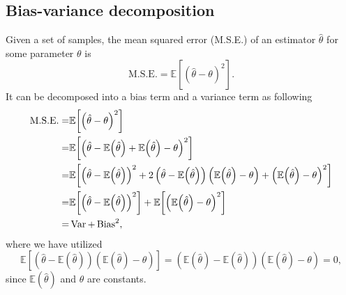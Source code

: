 \begin{appendices}
\chapter{Bias-variance decomposition\label{chapter:Appendix:BVD}}
Given a set of samples, the mean squared error (M.S.E.) of an estimator $\hat{\theta}$ for some parameter $\theta$ is
\begin{equation}
	\text{M.S.E.} = \mathbb{E}{\left[\left(\hat{\theta}-\theta\right)^2\right]}.
\end{equation}
It can be decomposed into a bias term and a variance term as following
\begin{align}
	\text{M.S.E.} =& \mathbb{E}{\left[\left(\hat{\theta}-\theta\right)^2\right]}\notag\\
	       =& \mathbb{E}{\left[\left(\hat{\theta}-\mathbb{E}{\left(\hat{\theta}\right)}+\mathbb{E}{\left(\hat{\theta}\right)}-\theta\right)^2\right]}\notag\\
	       =& \mathbb{E}{\left[ \left(\hat{\theta}-\mathbb{E}{\left(\hat{\theta}\right)}\right)^2+ 2\left(\hat{\theta}-\mathbb{E}{\left(\hat{\theta}\right)}\right)\left(\mathbb{E}{\left(\hat{\theta}\right)}-\theta\right)  +\left(\mathbb{E}{\left(\hat{\theta}\right)}-\theta\right)^2\right]}\notag\\
	       =&\mathbb{E}{\left[ \left(\hat{\theta}-\mathbb{E}{\left(\hat{\theta}\right)}\right)^2\right]}+\mathbb{E}{\left[\left(\mathbb{E}{\left(\hat{\theta}\right)}-\theta\right)^2\right]}\notag\\
	       =& \operatorname{Var}+\operatorname{Bias}^2,
\end{align}
where we have utilized 
\begin{equation}
	\mathbb{E}{\left[\left(\hat{\theta}-\mathbb{E}{\left(\hat{\theta}\right)}\right)\left(\mathbb{E}{\left(\hat{\theta}\right)}-\theta\right)\right]}=\left(\mathbb{E}\left(\hat{\theta}\right)-\mathbb{E}{\left(\hat{\theta}\right)}\right)\left(\mathbb{E}{\left(\hat{\theta}\right)}-\theta\right)=0,
\end{equation}
since $\mathbb{E}(\hat{\theta})$ and $\theta$ are constants.

\end{appendices}